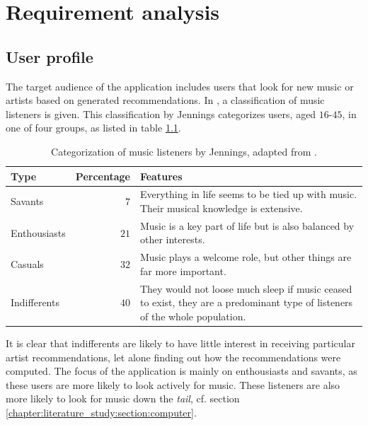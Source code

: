 \chapter{Requirement analysis}\label{chapter:requirements}

\section{User profile}

The target audience of the application includes users that look for new music or artists based on generated recommendations. In \cite{song:2012}, a classification of music listeners is given. This classification by Jennings categorizes users, aged $16$-$45$, in one of four groups, as listed in table \ref{table:jennings:listeners}.


\begin{table}[h]
\caption{Categorization of music listeners by Jennings, adapted from \cite{song:2012}.}
\begin{center}
	\begin{tabular}{ l | r | p{250px} } %
		\hline
		\textbf{Type}			&		\textbf{Percentage}			&			\textbf{Features} \\
		\hline
		Savants 			& $7$		& Everything in life seems to be tied up with music. Their musical knowledge is extensive. \\
		Enthousiasts 	& $21$	& Music is a key part of life but is also balanced by other interests. \\
		Casuals				& $32$	& Music plays a welcome role, but other things are far more important. \\
		Indifferents	& $40$	& They would not loose much sleep if music ceased to exist, they are a predominant type of listeners of the whole population. \\
		\hline
	\end{tabular}
\end{center}
\label{table:jennings:listeners}
\end{table}

It is clear that indifferents are likely to have little interest in receiving particular artist recommendations, let alone finding out how the recommendations were computed. The focus of the application is mainly on enthousiasts and savants, as these users are more likely to look actively for music. These listeners are also more likely to look for music down the \emph{tail}\cite{song:2012}, cf. section \ref{chapter:literature_study:section:computer}.

